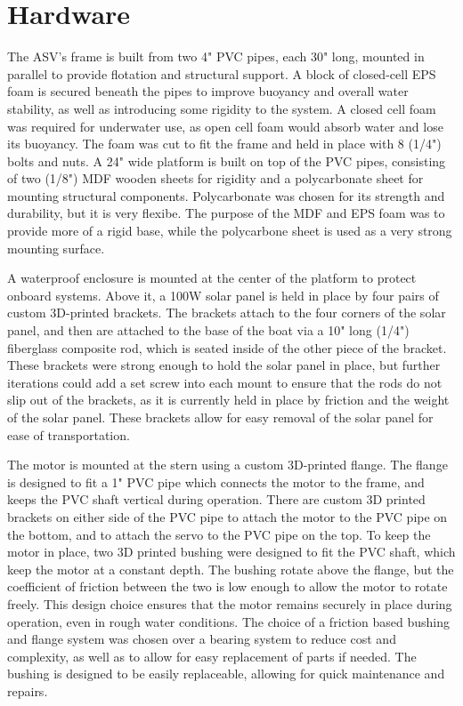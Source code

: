 \section{Hardware}

The ASV's frame is built from two 4" PVC pipes, each 30" long, mounted in parallel to provide flotation and structural support. A block of closed-cell EPS foam is secured beneath the pipes to improve buoyancy and overall water stability, as well as introducing some rigidity to the system. A closed cell foam was required for underwater use, as open cell foam would absorb water and lose its buoyancy. The foam was cut to fit the frame and held in place with 8 (1/4") bolts and nuts. A 24" wide platform is built on top of the PVC pipes, consisting of two (1/8") MDF wooden sheets for rigidity and a polycarbonate sheet for mounting structural components. Polycarbonate was chosen for its strength and durability, but it is very flexibe. The purpose of the MDF and EPS foam was to provide more of a rigid base, while the polycarbone sheet is used as a very strong mounting surface. 

A waterproof enclosure is mounted at the center of the platform to protect onboard systems. Above it, a 100W solar panel is held in place by four pairs of custom 3D-printed brackets. The brackets attach to the four corners of the solar panel, and then are attached to the base of the boat via a 10" long (1/4") fiberglass composite rod, which is seated inside of the other piece of the bracket. These brackets were strong enough to hold the solar panel in place, but further iterations could add a set screw into each mount to ensure that the rods do not slip out of the brackets, as it is currently held in place by friction and the weight of the solar panel. These brackets allow for easy removal of the solar panel for ease of transportation.

The motor is mounted at the stern using a custom 3D-printed flange. The flange is designed to fit a 1" PVC pipe which connects the motor to the frame, and keeps the PVC shaft vertical during operation. There are custom 3D printed brackets on either side of the PVC pipe to attach the motor to the PVC pipe on the bottom, and to attach the servo to the PVC pipe on the top. To keep the motor in place, two 3D printed bushing were designed to fit the PVC shaft, which keep the motor at a constant depth. The bushing rotate above the flange, but the coefficient of friction between the two is low enough to allow the motor to rotate freely. This design choice ensures that the motor remains securely in place during operation, even in rough water conditions. The choice of a friction based bushing and flange system was chosen over a bearing system to reduce cost and complexity, as well as to allow for easy replacement of parts if needed. The bushing is designed to be easily replaceable, allowing for quick maintenance and repairs.

